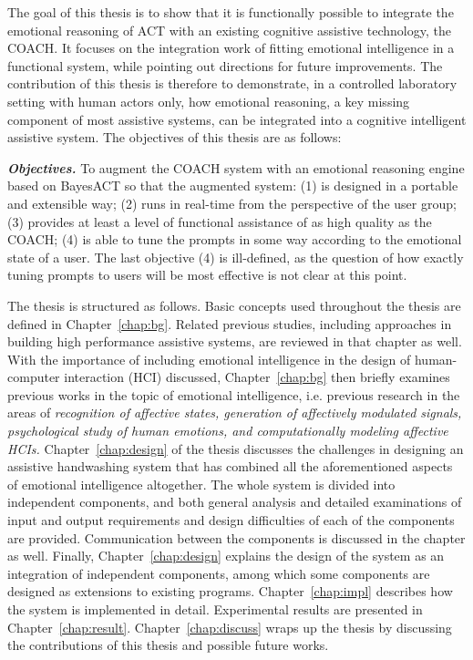 The goal of this thesis is to show that it is functionally possible to integrate the emotional reasoning of ACT with an existing cognitive assistive technology, the COACH. It focuses on the integration work of fitting emotional intelligence in a functional system, while pointing out directions for future improvements. The contribution of this thesis is therefore to demonstrate, in a controlled laboratory setting with human actors only, how emotional reasoning, a key missing component of most assistive systems, can be integrated into a cognitive intelligent assistive system. The objectives of this thesis are as follows:

\textbf{\textit{Objectives.}} To augment the COACH system with an emotional reasoning engine based on BayesACT so that the augmented system: (1) is designed in a portable and extensible way; (2) runs in real-time from the perspective of the user group; (3) provides at least a level of functional assistance of as high quality as the COACH; (4) is able to tune the prompts in some way according to the emotional state of a user. The last objective (4) is ill-defined, as the question of how exactly tuning prompts to users will be most effective is not clear at this point.

The thesis is structured as follows. Basic concepts used throughout the thesis are defined in Chapter~\ref{chap:bg}. Related previous studies, including approaches in building high performance assistive systems, are reviewed in that chapter as well. With the importance of including emotional intelligence in the design of human-computer interaction (HCI) discussed, Chapter~\ref{chap:bg} then briefly examines previous works in the topic of emotional intelligence, i.e. previous research in the areas of \textit{recognition of affective states, generation of affectively modulated signals, psychological study of human emotions, and computationally modeling affective HCIs.} Chapter~\ref{chap:design} of the thesis discusses the challenges in designing an assistive handwashing system that has combined all the aforementioned aspects of emotional intelligence altogether. The whole system is divided into independent components, and both general analysis and detailed examinations of input and output requirements and design difficulties of each of the components are provided. Communication between the components is discussed in the chapter as well. Finally, Chapter~\ref{chap:design} explains the design of the system as an integration of independent components, among which some components are designed as extensions to existing programs. Chapter~\ref{chap:impl} describes how the system is implemented in detail. Experimental results are presented in Chapter~\ref{chap:result}. Chapter~\ref{chap:discuss} wraps up the thesis by discussing the contributions of this thesis and possible future works.
